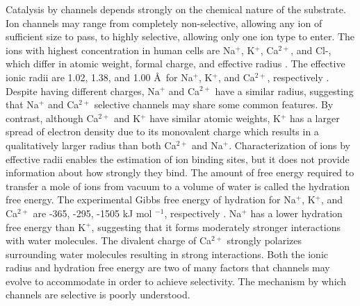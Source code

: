 \begin{refsection}
Catalysis by channels depends strongly on the chemical nature of the substrate. Ion channels may range from completely non-selective, allowing any ion of sufficient size to pass, to highly selective, allowing only one ion type to enter. The ions with highest concentration in human cells are Na$^+$, K$^+$, Ca$^{2+}$, and Cl-, which differ in atomic weight, formal charge, and effective radius \cite{Hille:2001tw}. The effective ionic radii are 1.02, 1.38, and 1.00 \AA\ for Na$^+$, K$^+$, and Ca$^{2+}$, respectively \cite{Shannon:1976dq}. Despite having different charges, Na$^+$ and Ca$^{2+}$ have a similar radius, suggesting that Na$^+$ and Ca$^{2+}$ selective channels may share some common features. By contrast, although Ca$^{2+}$ and K$^+$ have similar atomic weights, K$^+$ has a larger spread of electron density due to its monovalent charge which results in a qualitatively larger radius than both Ca$^{2+}$ and Na$^+$. Characterization of ions by effective radii enables the estimation of ion binding sites, but it does not provide information about how strongly they bind. The amount of free energy required to transfer a mole of ions from vacuum to a volume of water is called the hydration free energy. The experimental Gibbs free energy of hydration for Na$^+$, K$^+$, and Ca$^{2+}$ are -365, -295, -1505 kJ mol $^{-1}$, respectively \cite{Marcus:1991kp}. Na$^+$ has a lower hydration free energy than K$^+$, suggesting that it forms moderately stronger interactions with water molecules. The divalent charge of Ca$^{2+}$ strongly polarizes surrounding water molecules resulting in strong interactions. Both the ionic radius and hydration free energy are two of many factors that channels may evolve to accommodate in order to achieve selectivity. The mechanism by which channels are selective is poorly understood.


\end{refsection}
